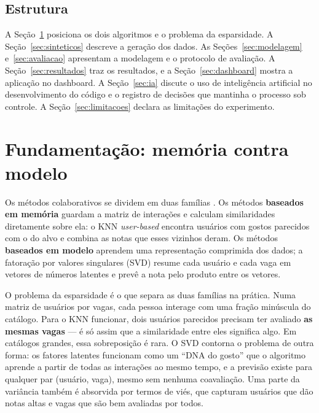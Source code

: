 \documentclass[12pt,a4paper]{article}
\begin{document}
\subsection{Estrutura}

A Seção~\ref{sec:fundamentacao} posiciona os dois algoritmos e o problema da esparsidade. A Seção~\ref{sec:sinteticos} descreve a geração dos dados. As Seções~\ref{sec:modelagem} e~\ref{sec:avaliacao} apresentam a modelagem e o protocolo de avaliação. A Seção~\ref{sec:resultados} traz os resultados, e a Seção~\ref{sec:dashboard} mostra a aplicação no dashboard. A Seção~\ref{sec:ia} discute o uso de inteligência artificial no desenvolvimento do código e o registro de decisões que mantinha o processo sob controle. A Seção~\ref{sec:limitacoes} declara as limitações do experimento.

\section{Fundamentação: memória contra modelo}\label{sec:fundamentacao}

Os métodos colaborativos se dividem em duas famílias \cite{aggarwal}. Os métodos \textbf{baseados em memória} guardam a matriz de interações e calculam similaridades diretamente sobre ela: o KNN \textit{user-based} \cite{grouplens} encontra usuários com gostos parecidos com o do alvo e combina as notas que esses vizinhos deram. Os métodos \textbf{baseados em modelo} aprendem uma representação comprimida dos dados; a fatoração por valores singulares (SVD) \cite{koren} resume cada usuário e cada vaga em vetores de números latentes e prevê a nota pelo produto entre os vetores.

O problema da esparsidade é o que separa as duas famílias na prática. Numa matriz de usuários por vagas, cada pessoa interage com uma fração minúscula do catálogo. Para o KNN funcionar, dois usuários parecidos precisam ter avaliado \textbf{as mesmas vagas} --- é só assim que a similaridade entre eles significa algo. Em catálogos grandes, essa sobreposição é rara. O SVD contorna o problema de outra forma: os fatores latentes funcionam como um ``DNA do gosto'' que o algoritmo aprende a partir de todas as interações ao mesmo tempo, e a previsão existe para qualquer par (usuário, vaga), mesmo sem nenhuma coavaliação. Uma parte da variância também é absorvida por termos de viés, que capturam usuários que dão notas altas e vagas que são bem avaliadas por todos.
\end{document}

